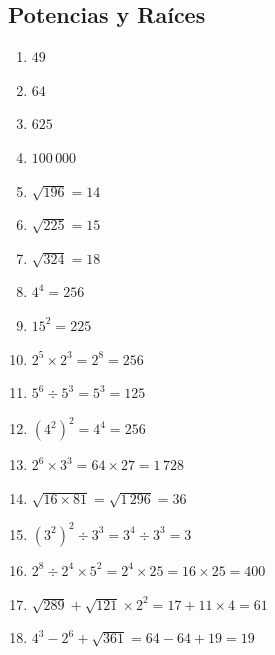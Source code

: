 \documentclass[12pt, letterpaper]{article}
\begin{document}
  \subsection*{Potencias y Raíces}
  \begin{enumerate}[leftmargin=*, label=\textbf{\arabic*.}]
    \item $49$
    \item $64$
    \item $625$
    \item $100\,000$
    \item $\sqrt{196} = 14$
    \item $\sqrt{225} = 15$
    \item $\sqrt{324} = 18$
    \item $4^4 = 256$
    \item $15^2 = 225$
    \item $2^5 \times 2^3 = 2^8 = 256$
    \item $5^6 \div 5^3 = 5^3 = 125$
    \item $(4^2)^2 = 4^4 = 256$
    \item $2^6 \times 3^3 = 64 \times 27 = 1\,728$
    \item $\sqrt{16 \times 81} = \sqrt{1\,296} = 36$
    \item $(3^2)^2 \div 3^3 = 3^4 \div 3^3 = 3$
    \item $2^8 \div 2^4 \times 5^2 = 2^4 \times 25 = 16 \times 25 = 400$
    \item $\sqrt{289} + \sqrt{121} \times 2^2 = 17 + 11 \times 4 = 61$
    \item $4^3 - 2^6 + \sqrt{361} = 64 - 64 + 19 = 19$
  \end{enumerate}
\end{document}
